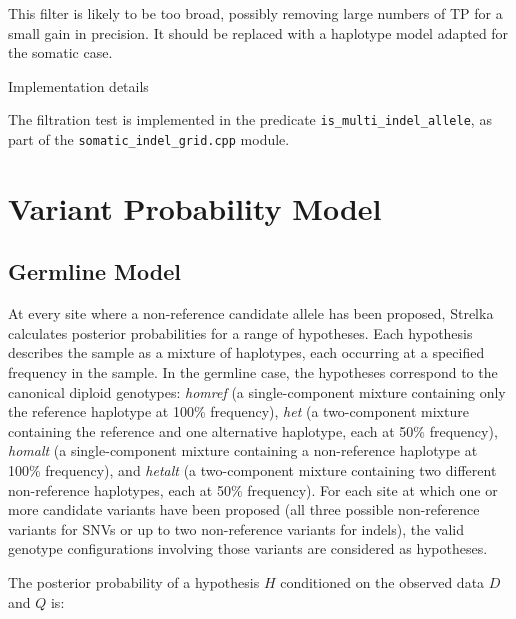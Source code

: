 \documentclass{article}
\newenvironment{raggedParagraph}[1]
{
    \begin{paragraph} {#1}
        \raggedright
    }
    {
    \end{paragraph}
}
\begin{document}
This filter is likely to be too broad, possibly removing large numbers of TP for a small gain in precision. It should be replaced with a haplotype model adapted for the somatic case.

\begin{raggedParagraph}{Implementation details}

The filtration test is implemented in the predicate \verb|is_multi_indel_allele|, as part of the \verb|somatic_indel_grid.cpp| module.

\end{raggedParagraph}

\fi %


\section{Variant Probability Model}
\subsection{Germline Model}
\label{sec:germline}
At every site where a non-reference candidate allele has been proposed, Strelka calculates posterior probabilities for a range of hypotheses. Each hypothesis describes the sample as a mixture of haplotypes, each occurring at a specified frequency in the sample. In the germline case, the hypotheses correspond to the canonical diploid genotypes: \emph{homref} (a single-component mixture containing only the reference haplotype at 100\% frequency), \emph{het} (a two-component mixture containing the reference and one alternative haplotype, each at 50\% frequency), \emph{homalt} (a single-component mixture containing a non-reference haplotype at 100\% frequency), and \emph{hetalt} (a two-component mixture containing two different non-reference haplotypes, each at 50\% frequency). For each site at which one or more candidate variants have been proposed (all three possible non-reference variants for SNVs or up to two non-reference variants for indels), the valid genotype configurations involving those variants are considered as hypotheses.

The posterior probability of a hypothesis $H$ conditioned on the observed data $D$ and $Q$ is:
\end{document}
